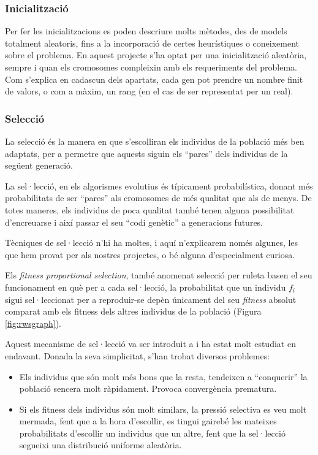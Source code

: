 \subsubsection{Inicialització} 

Per fer les inicialitzacions es poden descriure molts mètodes, des de models
totalment aleatoris, fins a la incorporació de certes heurístiques o coneixement
sobre el problema. En aquest projecte s'ha optat per una inicialització
aleatòria, sempre i quan els cromosomes compleixin amb els requeriments del
problema.  Com s'explica en cadascun dels apartats, cada gen pot prendre un
nombre finit de valors, o com a màxim, un rang (en el cas de ser representat per
un real).

\subsubsection{Selecció}
\label{subs:Iseleccio}
La selecció és la manera en que s'escolliran els individus de la població més
ben adaptats, per a permetre que aquests siguin els ``pares'' dels individus de
la següent generació.

La sel·lecció, en els algorismes evolutius és típicament probabilística, donant
més probabilitats de ser ``pares'' als cromosomes de més qualitat que als de
menys.  De totes maneres, els individus de poca qualitat també tenen alguna
possibilitat d'encreuarse i així passar el seu ``codi genètic'' a generacions
futures.

Tècniques de sel·lecció n'hi ha moltes, i aquí n'explicarem només algunes, les
que hem provat per als nostres projectes, o bé alguna d'especialment curiosa.

Els \emph{fitness proportional selection}, també anomenat selecció per ruleta
basen el seu funcionament en què per a cada sel·lecció, la probabilitat que un
individu $f_i$ sigui sel·leccionat per a reproduir-se depèn únicament del seu
\emph{fitness} absolut comparat amb els fitness dels altres individus de la
població (Figura \ref{fig:rwsgraph}).

Aquest mecanisme de sel·lecció va ser introduit a \cite{H75} i ha estat molt
estudiat en endavant.  Donada la seva simplicitat, s'han trobat diversos
problemes:

\begin{itemize}
	\item Els individus que són molt més bons que la resta, tendeixen a
	``conquerir'' la població sencera molt ràpidament. Provoca convergència
	prematura.
	\item Si els fitness dels individus són molt similars, la pressió selectiva
	es veu molt mermada, fent que a la hora d'escollir, es tingui gairebé les
	mateixes probabilitats d'escollir un individus que un altre, fent que la
	sel·lecció segueixi una distribució uniforme aleatòria.
\end{itemize}


